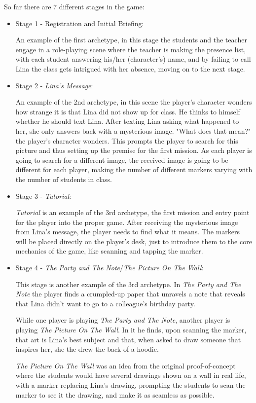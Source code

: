 \par So far there are 7 different stages in the game:
\begin{itemize}
	\item Stage 1 - Registration and Initial Briefing: 
	\par An example of the first archetype, in this stage the students and the teacher engage in a role-playing scene where the teacher is making the presence list, with each student answering his/her (character's) name, and by failing to call Lina the class gets intrigued with her absence, moving on to the next stage.
	
	\item Stage 2 - \textit{Lina's Message}: 
	\par An example of the 2nd archetype, in this scene the player's character wonders how strange it is that Lina did not show up for class. He thinks to himself whether he should text Lina. After texting Lina asking what happened to her, she only answers back with a mysterious image. "What does that mean?" the player's character wonders. This prompts the player to search for this picture and thus setting up the premise for the first mission. As each player is going to search for a different image, the received image is going to be different for each player, making the number of different markers varying with the number of students in class.
	
	\item Stage 3 - \textit{Tutorial}: 
	\par \textit{Tutorial} is an example of the 3rd archetype, the first mission and entry point for the player into the proper game. After receiving the mysterious image from Lina's message, the player needs to find what it means. The markers will be placed directly on the player's desk, just to introduce them to the core mechanics of the game, like scanning and tapping the marker.
	
	\item Stage 4 - \textit{The Party and The Note}/\textit{The Picture On The Wall}: 
	\par This stage is another example of the 3rd archetype. In \textit{The Party and The Note} the player finds a crumpled-up paper that unravels a note that reveals that Lina didn't want to go to a colleague's birthday party. \par While one player is playing \textit{The Party and The Note}, another player is playing \textit{The Picture On The Wall}. In it he finds, upon scanning the marker, that art is Lina's best subject and that, when asked to draw someone that inspires her, she the drew the back of a hoodie.  \par \textit{The Picture On The Wall} was an idea from the original proof-of-concept where the students would have several drawings shown on a wall in real life, with a marker replacing Lina's drawing, prompting the students to scan the marker to see it the drawing, and make it as seamless as possible.
	

\end{itemize}
